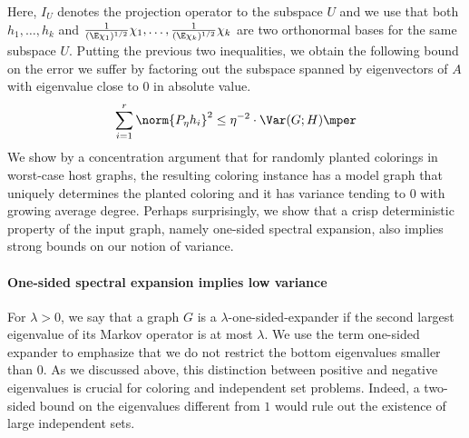 Here, \(I_{U}\) denotes the projection operator to the subspace \(U\) and we use that both \(h_{1},\ldots,h_{k}\) and \(\tfrac {1}{(\E\chi_{1})^{1/2}}\chi_{1},\ldots,\tfrac {1}{(\E\chi_{k})^{1/2}}\chi_{k}\) are two orthonormal bases for the same subspace \(U\).
Putting the previous two inequalities, we obtain the following bound on the error we suffer by factoring out the subspace spanned by eigenvectors of \(A\) with eigenvalue close to \(0\) in absolute value.
\begin{equation}
  \sum_{i=1}^{r}\norm{P_{\eta} h_{i}}^{2} \le \eta^{-2}\cdot \Var(G; H)\mper
\end{equation}
We show by a concentration argument that for randomly planted colorings in worst-case host graphs, the resulting coloring instance has a model graph that uniquely determines the planted coloring and it has variance tending to \(0\) with growing average degree.
Perhaps surprisingly, we show that a crisp deterministic property of the input graph, namely one-sided spectral expansion, also implies strong bounds on our notion of variance.

\paragraph{One-sided spectral expansion implies low variance}

For \(\lambda>0\), we say that a graph \(G\) is a \(\lambda\)-one-sided-expander if the second largest eigenvalue of its Markov operator is at most \(\lambda\).
We use the term one-sided expander to emphasize that we do not restrict the bottom eigenvalues smaller than \(0\).
As we discussed above, this distinction between positive and negative eigenvalues is crucial for coloring and independent set problems.
Indeed, a two-sided bound on the eigenvalues different from \(1\) would rule out the existence of large independent sets.

